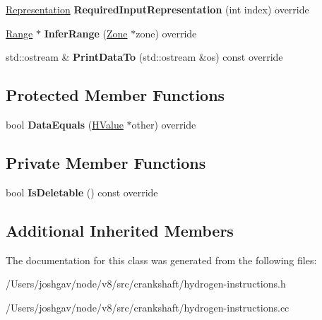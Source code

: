 \begin{DoxyCompactItemize}
\item 
\hyperlink{classv8_1_1internal_1_1_representation}{Representation} {\bfseries Required\+Input\+Representation} (int index) override\hypertarget{classv8_1_1internal_1_1_h_change_a4b44ca3eb82ae94615ff7d59f074bf69}{}\label{classv8_1_1internal_1_1_h_change_a4b44ca3eb82ae94615ff7d59f074bf69}

\item 
\hyperlink{classv8_1_1internal_1_1_range}{Range} $\ast$ {\bfseries Infer\+Range} (\hyperlink{classv8_1_1internal_1_1_zone}{Zone} $\ast$zone) override\hypertarget{classv8_1_1internal_1_1_h_change_a147f35c082c333b814a4c4f5d0f7c66d}{}\label{classv8_1_1internal_1_1_h_change_a147f35c082c333b814a4c4f5d0f7c66d}

\item 
std\+::ostream \& {\bfseries Print\+Data\+To} (std\+::ostream \&os) const  override\hypertarget{classv8_1_1internal_1_1_h_change_a8e6872ac748a7e6389098b85bcb9c374}{}\label{classv8_1_1internal_1_1_h_change_a8e6872ac748a7e6389098b85bcb9c374}

\end{DoxyCompactItemize}
\subsection*{Protected Member Functions}
\begin{DoxyCompactItemize}
\item 
bool {\bfseries Data\+Equals} (\hyperlink{classv8_1_1internal_1_1_h_value}{H\+Value} $\ast$other) override\hypertarget{classv8_1_1internal_1_1_h_change_a993d2f15ff5e2a4e0fb8e60b9ffd6a46}{}\label{classv8_1_1internal_1_1_h_change_a993d2f15ff5e2a4e0fb8e60b9ffd6a46}

\end{DoxyCompactItemize}
\subsection*{Private Member Functions}
\begin{DoxyCompactItemize}
\item 
bool {\bfseries Is\+Deletable} () const  override\hypertarget{classv8_1_1internal_1_1_h_change_a35144b8a8b234bbc38feac18c5114114}{}\label{classv8_1_1internal_1_1_h_change_a35144b8a8b234bbc38feac18c5114114}

\end{DoxyCompactItemize}
\subsection*{Additional Inherited Members}


The documentation for this class was generated from the following files\+:\begin{DoxyCompactItemize}
\item 
/\+Users/joshgav/node/v8/src/crankshaft/hydrogen-\/instructions.\+h\item 
/\+Users/joshgav/node/v8/src/crankshaft/hydrogen-\/instructions.\+cc\end{DoxyCompactItemize}
